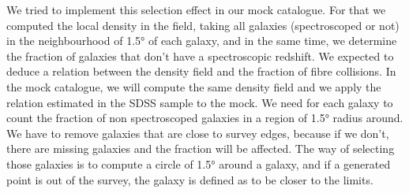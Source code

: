 We tried to implement this selection effect in our mock catalogue. For that we
computed the local density in the field, taking all galaxies (spectroscoped or
not) in the neighbourhood of 1.5° of each galaxy, and in the same time, we
determine the fraction of galaxies that don't have a spectroscopic redshift. We
expected to deduce a relation between the density field and the fraction of
fibre collisions. In the mock catalogue, we will compute the same density field
and we apply the relation estimated in the SDSS sample to the mock. We need for
each galaxy to count the fraction of non spectroscoped galaxies in a region of
1.5° radius around. We have to remove galaxies that are close to survey edges,
because if we don't, there are missing galaxies and the fraction will be
affected. The way of selecting those galaxies is to compute a circle of 1.5°
around a galaxy, and if a generated point is out of the survey, the galaxy is
defined as to be closer to the limits.

